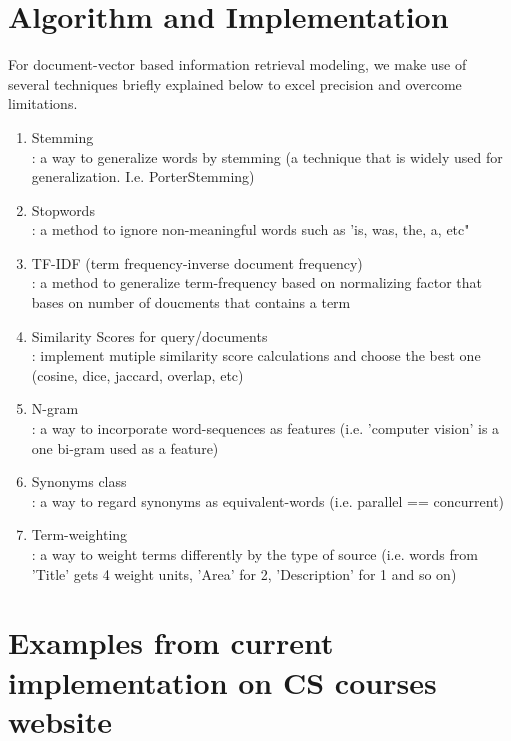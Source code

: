 \documentclass[twoside]{article}
\begin{document}
\section{Algorithm and Implementation}

For document-vector based information retrieval modeling, we make use of several techniques briefly explained below to excel precision and overcome limitations.

\begin{enumerate}
\item Stemming\\
: a way to generalize words by stemming (a technique that is widely used for generalization. I.e. PorterStemming)
\item Stopwords\\
: a method to ignore non-meaningful words such as 'is, was, the, a, etc"
\item TF-IDF (term frequency-inverse document frequency)\\
: a method to generalize term-frequency based on normalizing factor that bases on number of doucments that contains a term
\item Similarity Scores for query/documents\\
: implement mutiple similarity score calculations and choose the best one (cosine, dice, jaccard, overlap, etc)
\item N-gram\\
: a way to incorporate word-sequences as features (i.e. 'computer vision' is a one bi-gram used as a feature)
\item Synonyms class\\
: a way to regard synonyms as equivalent-words (i.e. parallel == concurrent)
\item Term-weighting\\
: a way to weight terms differently by the type of source (i.e. words from 'Title' gets 4 weight units, 'Area' for 2, 'Description' for 1 and so on)
\end{enumerate}

\section{Examples from current implementation on CS courses website}
\end{document}
